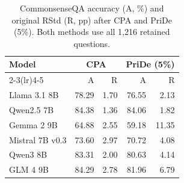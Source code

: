 \begin{table}[htbp]
\centering\small\setlength{\tabcolsep}{4pt}
\caption{CommonsenseQA accuracy (A, \%) and original RStd (R, pp) after CPA and PriDe (5\%). Both methods use all 1,216 retained questions.}
\label{tab:results-pride-csqa}
\begin{tabular}{lrrrr}
\toprule
Model & \multicolumn{2}{c}{CPA} & \multicolumn{2}{c}{PriDe (5\%)}\\
\cmidrule(lr){2-3}\cmidrule(lr){4-5}
 & A & R & A & R\\
\midrule
Llama 3.1 8B & 78.29 & 1.70 & 76.55 & 2.13\\
Qwen2.5 7B & 84.38 & 1.36 & 84.06 & 1.82\\
Gemma 2 9B & 64.88 & 2.55 & 59.18 & 11.35\\
Mistral 7B v0.3 & 73.60 & 2.97 & 70.72 & 4.08\\
Qwen3 8B & 83.31 & 2.00 & 80.63 & 4.14\\
GLM 4 9B & 84.29 & 2.78 & 81.96 & 6.79\\
\bottomrule
\end{tabular}
\end{table}
